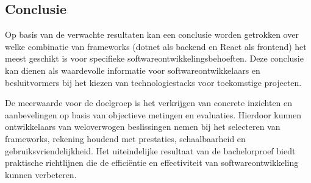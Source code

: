 \documentclass{hogent-article}
\begin{document}
\subsection{Conclusie}
Op basis van de verwachte resultaten kan een conclusie worden getrokken over welke combinatie van frameworks (dotnet als backend en React als frontend) het meest geschikt is voor specifieke softwareontwikkelingsbehoeften. Deze conclusie kan dienen als waardevolle informatie voor softwareontwikkelaars en besluitvormers bij het kiezen van technologiestacks voor toekomstige projecten.

De meerwaarde voor de doelgroep is het verkrijgen van concrete inzichten en aanbevelingen op basis van objectieve metingen en evaluaties. Hierdoor kunnen ontwikkelaars van weloverwogen beslissingen nemen bij het selecteren van frameworks, rekening houdend met prestaties, schaalbaarheid en gebruiksvriendelijkheid. Het uiteindelijke resultaat van de bachelorproef biedt praktische richtlijnen die de efficiëntie en effectiviteit van softwareontwikkeling kunnen verbeteren.
\printbibliography[heading=bibintoc]
\end{document}
